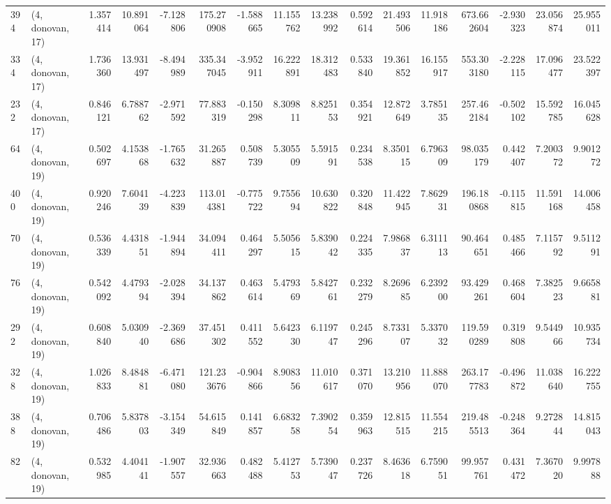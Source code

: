 \begin{tabular}{llrrrrrrrrrrrrrr}
394 &  (4, donovan, 17) &   1.357414 &  10.891064 &  -7.128806 &   175.270908 &  -1.588665 &  11.155762 &  13.238992 &  0.592614 &  21.493506 &  11.918186 &   673.662604 & -2.930323 &  23.056874 &  25.955011 \\
334 &  (4, donovan, 17) &   1.736360 &  13.931497 &  -8.494989 &   335.347045 &  -3.952911 &  16.222891 &  18.312483 &  0.533840 &  19.361852 &  16.155917 &   553.303180 & -2.228115 &  17.096477 &  23.522397 \\
232 &  (4, donovan, 17) &   0.846121 &   6.788762 &  -2.971592 &    77.883319 &  -0.150298 &   8.309811 &   8.825153 &  0.354921 &  12.872649 &   3.785135 &   257.462184 & -0.502102 &  15.592785 &  16.045628 \\
64  &  (4, donovan, 19) &   0.502697 &   4.153868 &  -1.765632 &    31.265887 &   0.508739 &   5.305509 &   5.591591 &  0.234538 &   8.350115 &   6.796309 &    98.035179 &  0.442407 &   7.200372 &   9.901272 \\
400 &  (4, donovan, 19) &   0.920246 &   7.604139 &  -4.223839 &   113.014381 &  -0.775722 &   9.755694 &  10.630822 &  0.320848 &  11.422945 &   7.862931 &   196.180868 & -0.115815 &  11.591168 &  14.006458 \\
70  &  (4, donovan, 19) &   0.536339 &   4.431851 &  -1.944894 &    34.094411 &   0.464297 &   5.505615 &   5.839042 &  0.224335 &   7.986837 &   6.311113 &    90.464651 &  0.485466 &   7.115792 &   9.511291 \\
76  &  (4, donovan, 19) &   0.542092 &   4.479394 &  -2.028394 &    34.137862 &   0.463614 &   5.479369 &   5.842761 &  0.232279 &   8.269685 &   6.239200 &    93.429261 &  0.468604 &   7.382523 &   9.665881 \\
292 &  (4, donovan, 19) &   0.608840 &   5.030940 &  -2.369686 &    37.451302 &   0.411552 &   5.642330 &   6.119747 &  0.245296 &   8.733107 &   5.337032 &   119.590289 &  0.319808 &   9.544966 &  10.935734 \\
328 &  (4, donovan, 19) &   1.026833 &   8.484881 &  -6.471080 &   121.233676 &  -0.904866 &   8.908356 &  11.010617 &  0.371070 &  13.210956 &  11.888070 &   263.177783 & -0.496872 &  11.038640 &  16.222755 \\
388 &  (4, donovan, 19) &   0.706486 &   5.837803 &  -3.154349 &    54.615849 &   0.141857 &   6.683258 &   7.390254 &  0.359963 &  12.815515 &  11.554215 &   219.485513 & -0.248364 &   9.272844 &  14.815043 \\
82  &  (4, donovan, 19) &   0.532985 &   4.404141 &  -1.907557 &    32.936663 &   0.482488 &   5.412753 &   5.739047 &  0.237726 &   8.463618 &   6.759051 &    99.957761 &  0.431472 &   7.367020 &   9.997888 \\

\end{tabular}
